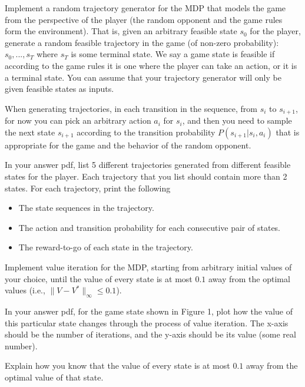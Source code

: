 \documentclass{article}
\begin{document}
\begin{question}[2 Points]
Implement a random trajectory generator for the MDP that models the game from the perspective of the player (the random opponent and the game rules form the environment). 
That is, given an arbitrary feasible state $s_0$ for the player, generate a random feasible trajectory in the game (of non-zero probability): $s_0,...,s_T$ where $s_T$ is some terminal state. We say a game state is feasible if according to the game rules it is one where the player can take an action, or it is a terminal state. You can assume that your trajectory generator will only be given feasible states as inputs. 

When generating trajectories, in each transition in the sequence, from $s_i$ to $s_{i+1}$, for now you can pick an arbitrary action $a_i$ for $s_i$, and then you need to sample the next state $s_{i+1}$ according to the transition probability $P(s_{i+1}|s_{i},a_{i})$ that is appropriate for the game and the behavior of the random opponent. 

In your answer pdf, list 5 different trajectories generated from different feasible states for the player. Each trajectory that you list should contain more than 2 states. For each trajectory, print the following
\begin{itemize}
    \item The state sequences in the trajectory.
    \item The action and transition probability for each consecutive pair of states. 
    \item The reward-to-go of each state in the trajectory.
\end{itemize}
\end{question}

\begin{question}[3 Points]
Implement value iteration for the MDP, starting from arbitrary initial values of your choice, until the value of every state is at most $0.1$ away from the optimal values (i.e., $\|V-V^*\|_{\infty}\leq 0.1$). 

In your answer pdf, for the game state shown in Figure 1, plot how the value of this particular state changes through the process of value iteration. The x-axis should be the number of iterations, and the y-axis should be its value (some real number). 
\end{question}

\begin{question}[1 Point]
Explain how you know that the value of every state is at most $0.1$ away from the optimal value of that state. 
\end{question}
\end{document}
